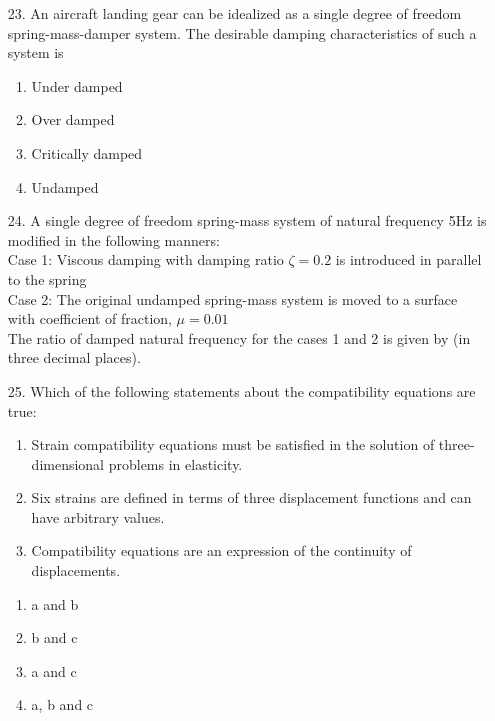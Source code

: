 \documentclass[journal]{IEEEtran}
\begin{document}
\begin{enumerate}
    \item[23.] An aircraft landing gear can be idealized as a single degree of freedom spring-mass-damper system. The desirable damping characteristics of such a system is  
     \begin{enumerate}[label=(\Alph*)]
        \item Under damped
        \item Over damped
        \item Critically damped
        \item Undamped
     \end{enumerate}
    \item[24.] A single degree of freedom spring-mass system of natural frequency 5Hz is modified in the following manners:
    \\ Case 1: Viscous damping with damping ratio $\zeta = 0.2$ is introduced in parallel to the spring
    \\ Case 2: The original undamped spring-mass system is moved to a surface with coefficient of fraction, $\mu = 0.01$\\
    The ratio of damped natural frequency for the cases 1 and 2 is given by (in three decimal places).
    \item[25.]  Which of the following statements about the compatibility equations are true:
    \begin{enumerate}
        \item Strain compatibility equations must be satisfied in the solution of three-dimensional problems in elasticity.
        \item Six strains are defined in terms of three displacement functions and can have arbitrary values.
        \item Compatibility equations are an expression of the continuity of displacements.
    \end{enumerate}
    \begin{enumerate}[label=(\Alph*)]
        \item a and b 
        \item b and c 
        \item a and c 
        \item a, b and c 
    \end{enumerate}
    

\end{enumerate}
\end{document}
